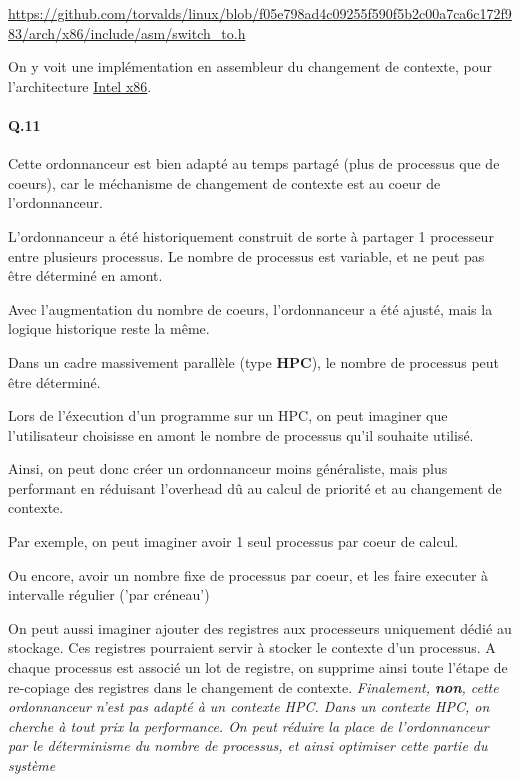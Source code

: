 \documentclass[10pt]{article}
\begin{document}
  \href{https://github.com/torvalds/linux/blob/f05e798ad4c09255f590f5b2c00a7ca6c172f983/arch/x86/include/asm/switch\_to.h}
  {https://github.com/torvalds/linux/blob/f05e798ad4c09255f590f5b2c00a7ca6c172f983/arch/x86/include/asm/switch\_to.h}

  On y voit une implémentation en assembleur du changement de contexte, pour l'architecture \href{https://fr.wikipedia.org/wiki/X86}{Intel x86}.
  
  \paragraph{Q.11} Cette ordonnanceur est bien adapté au temps partagé (plus de processus que de coeurs),
  car le méchanisme de changement de contexte est au coeur de l'ordonnanceur.
  
  L'ordonnanceur a été historiquement construit de sorte à partager 1 processeur entre plusieurs processus.
  Le nombre de processus est variable, et ne peut pas être déterminé en amont.
  
  Avec l'augmentation du nombre de coeurs, l'ordonnanceur a été ajusté, mais la logique historique reste la même.
  
  Dans un cadre massivement parallèle (type \textbf{HPC}), le nombre de processus peut être déterminé.
  
  Lors de l'éxecution d'un programme sur un HPC, on peut imaginer que l'utilisateur choisisse en amont le nombre de processus qu'il souhaite utilisé.
  
  Ainsi, on peut donc créer un ordonnanceur moins généraliste, mais plus performant en réduisant l'overhead dû au calcul de priorité et au changement de contexte.
  
  Par exemple, on peut imaginer avoir 1 seul processus par coeur de calcul.
  
  Ou encore, avoir un nombre fixe de processus par coeur, et les faire executer à intervalle régulier ('par créneau')
  
  On peut aussi imaginer ajouter des registres aux processeurs uniquement dédié au stockage.
  Ces registres pourraient servir à stocker le contexte d'un processus.
  A chaque processus est associé un lot de registre, on supprime ainsi toute
  l'étape de re-copiage des registres dans le changement de contexte.
  \newline
  \newline
  \newline
  \textit{Finalement, \textbf{non}, cette ordonnanceur n'est pas adapté à un contexte HPC. Dans un contexte HPC, on cherche
  à tout prix la performance. On peut réduire la place de l'ordonnanceur par le déterminisme du nombre de processus, et ainsi
  optimiser cette partie du système}
\end{document}
